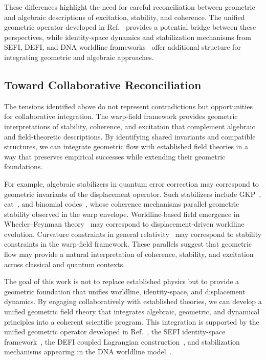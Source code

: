 \documentclass[aip,adv,reprint]{revtex4-2}
\begin{document}
These differences highlight the need for careful reconciliation between
geometric and algebraic descriptions of excitation, stability, and coherence.
The unified geometric operator developed in Ref.~\cite{Dutton_Unified_JMP_2026}
provides a potential bridge between these perspectives, while identity-space
dynamics and stabilization mechanisms from SEFI, DEFI, and DNA worldline
frameworks~\cite{Dutton_SEFI_JMP_2026,Dutton_DEFI_2026,Dutton_DNA_2026} offer
additional structure for integrating geometric and algebraic approaches.

\subsection{Toward Collaborative Reconciliation}

The tensions identified above do not represent contradictions but opportunities
for collaborative integration. The warp-field framework provides geometric
interpretations of stability, coherence, and excitation that complement
algebraic and field-theoretic descriptions. By identifying shared invariants
and compatible structures, we can integrate geometric flow with established
field theories in a way that preserves empirical successes while extending
their geometric foundations.

For example, algebraic stabilizers in quantum error correction may correspond to
geometric invariants of the displacement operator. Such stabilizers include
GKP~\cite{GKP_2001}, cat~\cite{Mirrahimi_2014}, and binomial codes~\cite{Michael_2016},
whose coherence mechanisms parallel geometric stability observed in the warp
envelope. Worldline-based field emergence in Wheeler--Feynman theory~\cite{Wheeler_Feynman_1945,Wheeler_Feynman_1949}
may correspond to displacement-driven worldline evolution. Curvature constraints
in general relativity~\cite{MTW_Gravitation_1973} may correspond to stability
constraints in the warp-field framework. These parallels suggest that geometric
flow may provide a natural interpretation of coherence, stability, and
excitation across classical and quantum contexts.

The goal of this work is not to replace established physics but to provide a
geometric foundation that unifies worldline, identity-space, and displacement
dynamics. By engaging collaboratively with established theories, we can develop
a unified geometric field theory that integrates algebraic, geometric, and
dynamical principles into a coherent scientific program. This integration is
supported by the unified geometric operator developed in Ref.~\cite{Dutton_Unified_JMP_2026},
the SEFI identity-space framework~\cite{Dutton_SEFI_JMP_2026}, the DEFI coupled
Lagrangian construction~\cite{Dutton_DEFI_2026}, and stabilization mechanisms
appearing in the DNA worldline model~\cite{Dutton_DNA_2026}.
\end{document}
